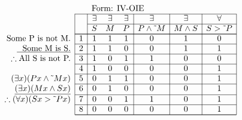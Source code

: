\documentclass[10pt,legalpaper,landscape,cmtt]{article}
\begin{document}
{\begin{minipage}[t]{3.25in}
	\(
	\begin{array}{r|c|ccc|c|c|c|}
		\multicolumn{2}{c}{}&\multicolumn{6}{l}{\mbox{Form: IV-OIE}} \\ \cline{2-8}
		\hspace{1in}	&	& \exists & \exists & \exists & \exists & \exists & \forall\\ \cline{3-8}
		&	& S & M & P &  P \wedge \tilde~M  &  M \wedge S  &  S > \tilde~P \\ \cline{2-8} \cline{2-8}
		\phantom{\therefore}\mbox{Some P is not M.}   & 1 & 1 & 1 & 1 &   0   &   1   &   0  \\ \cline{2-8}
		\underline{\phantom{\therefore}\mbox{Some M is S.}}   & 2 & 1 & 1 & 0 &   0   &   1   &   1  \\ \cline{2-8}
		\therefore \mbox{All S is not P.}   & 3 & 1 & 0 & 1 &   1   &   0   &   0  \\ \cline{2-8}
		& 4 & 1 & 0 & 0 &   0   &   0   &   1  \\ \cline{2-8}
		(\exists x)(Px \wedge \tilde~Mx)   & 5 & 0 & 1 & 1 &   0   &   0   &   1  \\ \cline{2-8}
		\underline{(\exists x)(Mx \wedge Sx)}   & 6 & 0 & 1 & 0 &   0   &   0   &   1  \\ \cline{2-8}
		\therefore(\forall x)(Sx > \tilde~Px)   & 7 & 0 & 0 & 1 &   1   &   0   &   1  \\ \cline{2-8}
		& 8 & 0 & 0 & 0 &   0   &   0   &   1   \\ \cline{2-8}\cline{2-8} 
	\end{array}
	\)
\end{minipage}

}
\end{document}
